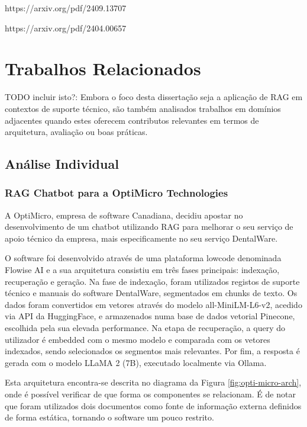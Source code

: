 https://arxiv.org/pdf/2409.13707

https://arxiv.org/pdf/2404.00657


\section{Trabalhos Relacionados}

TODO incluir isto?: Embora o foco desta dissertação seja a aplicação de RAG em contextos de suporte técnico, são também analisados trabalhos em domínios adjacentes quando estes oferecem contributos relevantes em termos de arquitetura, avaliação ou boas práticas.

\subsection{Análise Individual}

\subsubsection{RAG Chatbot para a OptiMicro Technologies}

A OptiMicro, empresa de software Canadiana, decidiu apostar no desenvolvimento de um chatbot utilizando RAG para melhorar o seu serviço de apoio técnico da empresa, mais especificamente no seu serviço DentalWare.

O software foi desenvolvido através de uma plataforma lowcode denominada Flowise AI e a sua arquitetura consistiu em três fases principais: indexação, recuperação e geração. Na fase de indexação, foram utilizados registos de suporte técnico e manuais do software DentalWare, segmentados em chunks de texto. Os dados foram convertidos em vetores através do modelo all-MiniLM-L6-v2, acedido via API da HuggingFace, e armazenados numa base de dados vetorial Pinecone, escolhida pela sua elevada performance. Na etapa de recuperação, a query do utilizador é embedded com o mesmo modelo e comparada com os vetores indexados, sendo selecionados os segmentos mais relevantes. Por fim, a resposta é gerada com o modelo LLaMA 2 (7B), executado localmente via Ollama. 

Esta arquitetura encontra-se descrita no diagrama da Figura \ref{fig:opti-micro-arch}, onde é possível verificar de que forma os componentes se relacionam. É de notar que foram utilizados dois documentos como fonte de informação externa definidos de forma estática, tornando o software um pouco restrito.


